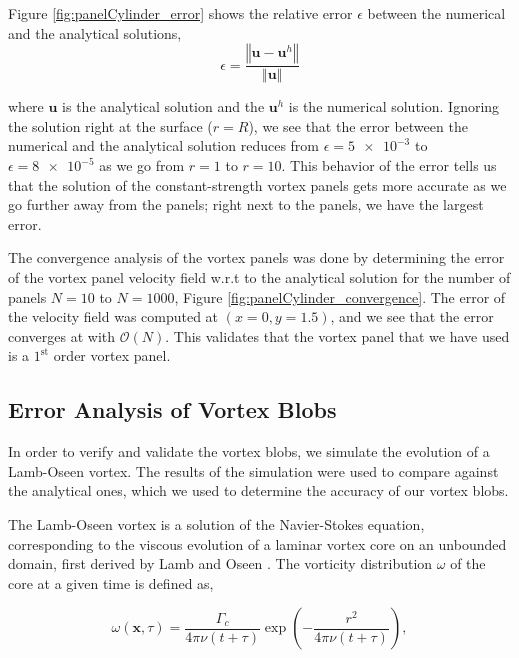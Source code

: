Figure \ref{fig:panelCylinder_error} shows the relative error $\epsilon$ between the numerical and the analytical solutions,
	\begin{equation}
	\epsilon = \frac{\left\Vert\mathbf{u}-\mathbf{u}^h\right\Vert}{\left\Vert\mathbf{u}\right\Vert}
	\label{eq:panelRelativeError}
	\end{equation}
	
where $\mathbf{u}$ is the analytical solution and the $\mathbf{u}^h$ is the numerical solution. Ignoring the solution right at the surface ($r=R$), we see that the error between the numerical and the analytical solution reduces from $\epsilon=\num{5e-3}$ to $\epsilon=\num{8e-5}$ as we go from $r=1$ to $r=10$. This behavior of the error tells us that the solution of the constant-strength vortex panels gets more accurate as we go further away from the panels; right next to the panels, we have the largest error.

The convergence analysis of the vortex panels was done by determining the error of the vortex panel velocity field w.r.t to the analytical solution for the number of panels $N = 10$ to $N = 1000$, Figure \ref{fig:panelCylinder_convergence}. The error of the velocity field was computed at $(x =0, y=1.5)$, and we see that the error converges at with $\mathcal{O}\left(N\right)$. This validates that the vortex panel that we have used is a $1^{\mathrm{st}}$ order vortex panel.

\subsection{Error Analysis of Vortex Blobs}
\label{subsec:lagrangianLambOseen}
In order to verify and validate the vortex blobs, we simulate the evolution of a Lamb-Oseen vortex. The results of the simulation were used to compare against the analytical ones, which we used to determine the accuracy of our vortex blobs.

The Lamb-Oseen vortex is a solution of the Navier-Stokes equation, corresponding to the viscous evolution of a laminar vortex core on an unbounded domain, first derived by Lamb and Oseen \cite{Tryggeson2007}. The vorticity distribution $\omega$ of the core at a given time is defined as,

	\begin{equation}
	\omega\left(\mathbf{x},\tau\right) = \frac{\Gamma_c}{4\pi\nu(t+\tau)} \exp\left(-\frac{r^2}{4\pi\nu(t+\tau)}\right),
	\label{eq:lo_voeq}
	\end{equation}

